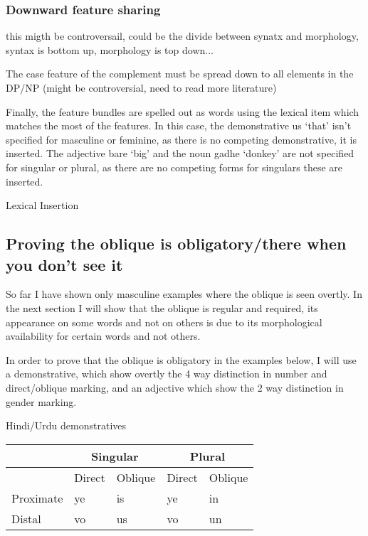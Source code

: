 \documentclass{article}
\begin{document}
\subsubsection{Downward feature sharing}
this migth be controversail, could be the divide between synatx and morphology, syntax is bottom up, morphology is top down...

\begin{example}The case feature of the complement must be spread down to all elements in the DP/NP (might be controversial, need to read more literature)
\end{example}



Finally, the feature bundles are spelled out as words using the lexical item which matches the most of the features. In this case, the demonstrative us `that' isn't specified for masculine or feminine, as there is no competing demonstrative, it is inserted. The adjective bare `big' and the noun gadhe `donkey' are not specified for singular or plural, as there are no competing forms for singulars these are inserted.

\begin{example}Lexical Insertion
\end{example}

\subsection{Proving the oblique is obligatory/there when you don't see it}

So far I have shown only masculine examples where the oblique is seen overtly. In the next section I will show that the oblique is regular and required, its appearance on some words and not on others is due to its morphological availability for certain words and not others.

In order to prove that the oblique is obligatory in the examples below, I will use a demonstrative, which show overtly the 4 way distinction in number and direct/oblique marking, and an adjective which show the 2 way distinction in gender marking.

\begin{example}Hindi/Urdu demonstratives\\
\begin{tabular}{|l|l|l|l|l|}\hline
& \multicolumn{2}{c|}{Singular} & \multicolumn{2}{c|}{Plural}  \\\hline
& Direct & Oblique & Direct & Oblique \\\hline\hline
Proximate & ye & is & ye & in\\
Distal & vo & us & vo & un\\\hline
\end{tabular}
\end{example}
\end{document}
